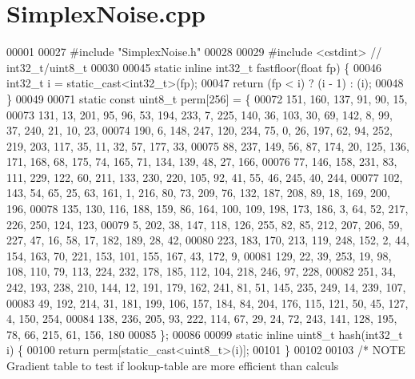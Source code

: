 \section{Simplex\+Noise.\+cpp}
\label{_simplex_noise_8cpp_source}

\begin{DoxyCode}
00001 
00027 \textcolor{preprocessor}{#include "SimplexNoise.h"}
00028 
00029 \textcolor{preprocessor}{#include <cstdint>}  \textcolor{comment}{// int32\_t/uint8\_t}
00030 
00045 \textcolor{keyword}{static} \textcolor{keyword}{inline} int32\_t fastfloor(\textcolor{keywordtype}{float} fp) \{
00046     int32\_t i = \textcolor{keyword}{static\_cast<}int32\_t\textcolor{keyword}{>}(fp);
00047     \textcolor{keywordflow}{return} (fp < i) ? (i - 1) : (i);
00048 \}
00049 
00071 \textcolor{keyword}{static} \textcolor{keyword}{const} uint8\_t perm[256] = \{
00072     151, 160, 137, 91, 90, 15,
00073     131, 13, 201, 95, 96, 53, 194, 233, 7, 225, 140, 36, 103, 30, 69, 142, 8, 99, 37, 240, 21, 10, 23,
00074     190, 6, 148, 247, 120, 234, 75, 0, 26, 197, 62, 94, 252, 219, 203, 117, 35, 11, 32, 57, 177, 33,
00075     88, 237, 149, 56, 87, 174, 20, 125, 136, 171, 168, 68, 175, 74, 165, 71, 134, 139, 48, 27, 166,
00076     77, 146, 158, 231, 83, 111, 229, 122, 60, 211, 133, 230, 220, 105, 92, 41, 55, 46, 245, 40, 244,
00077     102, 143, 54, 65, 25, 63, 161, 1, 216, 80, 73, 209, 76, 132, 187, 208, 89, 18, 169, 200, 196,
00078     135, 130, 116, 188, 159, 86, 164, 100, 109, 198, 173, 186, 3, 64, 52, 217, 226, 250, 124, 123,
00079     5, 202, 38, 147, 118, 126, 255, 82, 85, 212, 207, 206, 59, 227, 47, 16, 58, 17, 182, 189, 28, 42,
00080     223, 183, 170, 213, 119, 248, 152, 2, 44, 154, 163, 70, 221, 153, 101, 155, 167, 43, 172, 9,
00081     129, 22, 39, 253, 19, 98, 108, 110, 79, 113, 224, 232, 178, 185, 112, 104, 218, 246, 97, 228,
00082     251, 34, 242, 193, 238, 210, 144, 12, 191, 179, 162, 241, 81, 51, 145, 235, 249, 14, 239, 107,
00083     49, 192, 214, 31, 181, 199, 106, 157, 184, 84, 204, 176, 115, 121, 50, 45, 127, 4, 150, 254,
00084     138, 236, 205, 93, 222, 114, 67, 29, 24, 72, 243, 141, 128, 195, 78, 66, 215, 61, 156, 180
00085 \};
00086 
00099 \textcolor{keyword}{static} \textcolor{keyword}{inline} uint8\_t hash(int32\_t i) \{
00100     \textcolor{keywordflow}{return} perm[\textcolor{keyword}{static\_cast<}uint8\_t\textcolor{keyword}{>}(i)];
00101 \}
00102 
00103 \textcolor{comment}{/* NOTE Gradient table to test if lookup-table are more efficient than calculs}

\end{DoxyCode}
